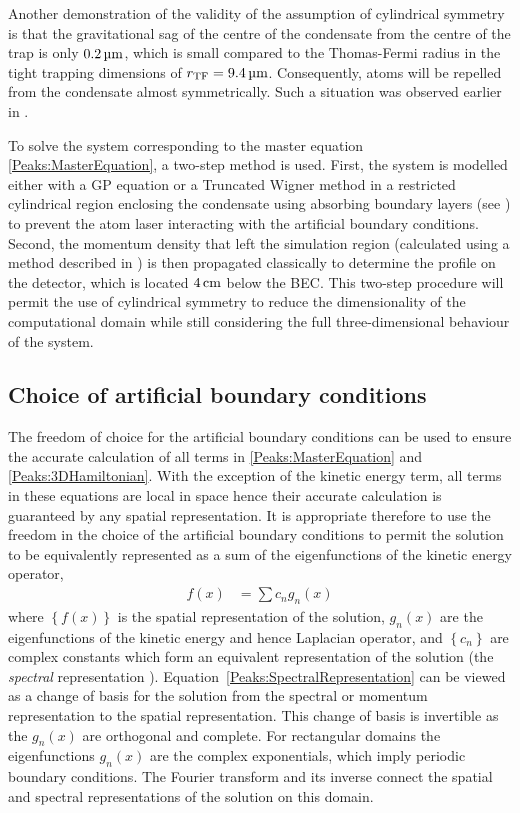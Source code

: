 Another demonstration of the validity of the assumption of cylindrical symmetry is that the gravitational sag of the centre of the condensate from the centre of the trap is only $\unit[0.2]{\micro m}$, which is small compared to the Thomas-Fermi radius in the tight trapping dimensions of $r_\text{TF} = \unit[9.4]{\micro m}$. Consequently, atoms will be repelled from the condensate almost symmetrically. Such a situation was observed earlier in .

To solve the system corresponding to the master equation \eqref{Peaks:MasterEquation}, a two-step method is used. First, the system is modelled either with a GP equation or a Truncated Wigner method in a restricted cylindrical region enclosing the condensate using absorbing boundary layers (see ) to prevent the atom laser interacting with the artificial boundary conditions. Second, the momentum density that left the simulation region (calculated using a method described in ) is then propagated classically to determine the profile on the detector, which is located $\unit[4]{cm}$ below the BEC. This two-step procedure will permit the use of cylindrical symmetry to reduce the dimensionality of the computational domain while still considering the full three-dimensional behaviour of the system.

\subsection{Choice of artificial boundary conditions}

The freedom of choice for the artificial boundary conditions can be used to ensure the accurate calculation of all terms in \eqref{Peaks:MasterEquation} and \eqref{Peaks:3DHamiltonian}. With the exception of the kinetic energy term, all terms in these equations are local in space hence their accurate calculation is guaranteed by any spatial representation. It is appropriate therefore to use the freedom in the choice of the artificial boundary conditions to permit the solution to be equivalently represented as a sum of the eigenfunctions of the kinetic energy operator,
\begin{align}
    \label{Peaks:SpectralRepresentation}
    f(x) &= \sum c_n g_n (x)
\end{align} 
where $\left\{f(x)\right\}$ is the spatial representation of the solution, $g_n(x)$ are the eigenfunctions of the kinetic energy and hence Laplacian operator, and $\left\{c_n\right\}$ are complex constants which form an equivalent representation of the solution (the \emph{spectral} representation \citep{Boyd:2000}). Equation~\eqref{Peaks:SpectralRepresentation} can be viewed as a change of basis for the solution from the spectral or momentum representation to the spatial representation. This change of basis is invertible as the $g_n(x)$ are orthogonal and complete. For rectangular domains the eigenfunctions $g_n(x)$ are the complex exponentials, which imply periodic boundary conditions. The Fourier transform and its inverse connect the spatial and spectral representations of the solution on this domain.

